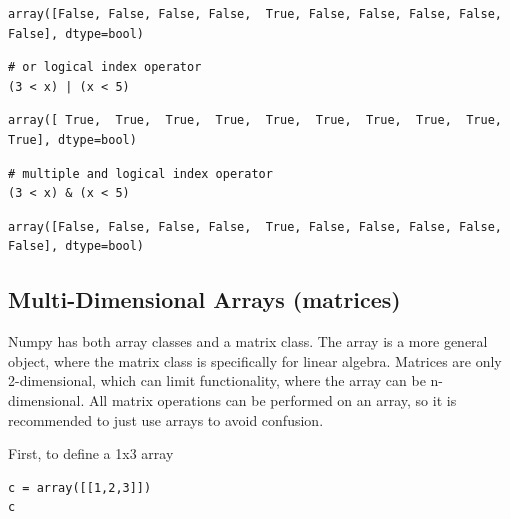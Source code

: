 \documentclass[%
oneside,                 %
final,                   %
10pt]{article}
\begin{document}
\begin{verbatim}
array([False, False, False, False,  True, False, False, False, False, False], dtype=bool)
\end{verbatim}

\begin{verbatim}
# or logical index operator
(3 < x) | (x < 5)
\end{verbatim}

\begin{verbatim}
array([ True,  True,  True,  True,  True,  True,  True,  True,  True,  True], dtype=bool)
\end{verbatim}

\begin{verbatim}
# multiple and logical index operator
(3 < x) & (x < 5)
\end{verbatim}

\begin{verbatim}
array([False, False, False, False,  True, False, False, False, False, False], dtype=bool)
\end{verbatim}

\subsection{Multi-Dimensional Arrays (matrices)}

Numpy has both array classes and a matrix class. The array is a more general object, where the matrix class is specifically for linear algebra. Matrices are only 2-dimensional, which can limit functionality, where the array can be n-dimensional. All matrix operations can be performed on an array, so it is recommended to just use arrays to avoid confusion.

First, to define a 1x3 array
\begin{verbatim}
c = array([[1,2,3]])
c
\end{verbatim}
\end{document}
